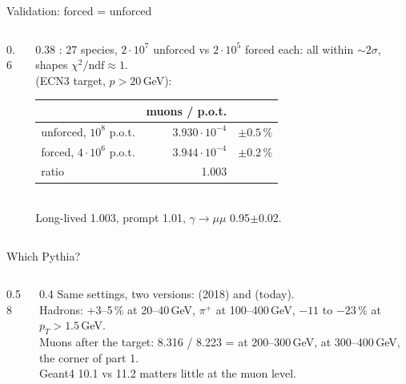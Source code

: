 \documentclass[aspectratio=169,10pt]{beamer}
\begin{document}
\begin{frame}{Validation: forced = unforced}
  \begin{columns}[c]
    \begin{column}{0.6\textwidth}
    \end{column}
    \begin{column}{0.38\textwidth}\footnotesize
      : 27 species, $2\cdot10^7$ unforced vs $2\cdot10^5$ forced each: all within $\sim2\sigma$, shapes $\chi^2/\text{ndf}\approx1$.\\[2mm]
       (ECN3 target, $p>20$\,GeV):\\[1mm]
      {\scriptsize\begin{tabular}{@{}lrr@{}}
        \toprule
        & muons / p.o.t. & \\
        \midrule
        unforced, $10^8$ p.o.t. & $3.930\cdot10^{-4}$ & $\pm0.5$\,\%\\
        forced, $4\cdot10^6$ p.o.t. & $3.944\cdot10^{-4}$ & $\pm0.2$\,\%\\
        ratio & \num{1.003} & \\
        \bottomrule
      \end{tabular}}\\[2mm]
      Long-lived 1.003, prompt 1.01, $\gamma\to\mu\mu$ 0.95$\pm$0.02.
    \end{column}
  \end{columns}
\end{frame}

\begin{frame}{Which Pythia?}
  \begin{columns}[c]
    \begin{column}{0.58\textwidth}
      \\[0.5mm]
    \end{column}
    \begin{column}{0.4\textwidth}\footnotesize
      Same settings, two versions:  (2018) and  (today).\\[1mm]
      Hadrons: +3--5\,\% at 20--40\,GeV,  $\pi^+$ at 100--400\,GeV, $-11$ to $-23$\,\% at $p_T>1.5$\,GeV.\\[1mm]
      Muons after the target: 8.316 / 8.223 =  at 200--300\,GeV,  at 300--400\,GeV, the corner of part 1.\\[1mm]
      Geant4 10.1 vs 11.2 matters little at the muon level.\\[1.5mm]
    \end{column}
  \end{columns}
\end{frame}
\end{document}

